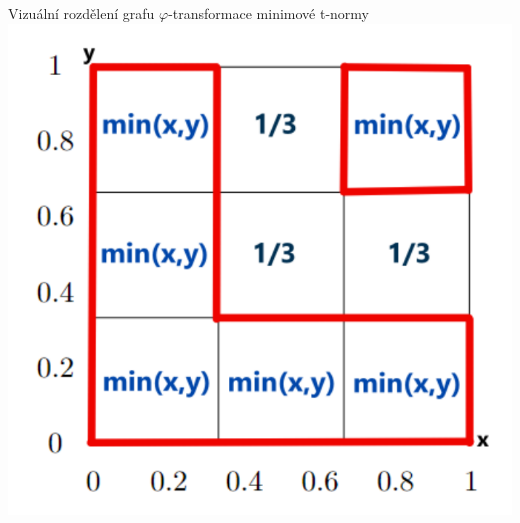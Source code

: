    
\begin{graph}Vizu\' aln\' i rozd\v elen\'i grafu $\varphi$-transformace minimov\' e t-normy\\
\tikzset{>=stealth}
\centering
\includegraphics[scale=0.8]{template-fig/phi-tnorm.pdf}
\end{graph}

    
